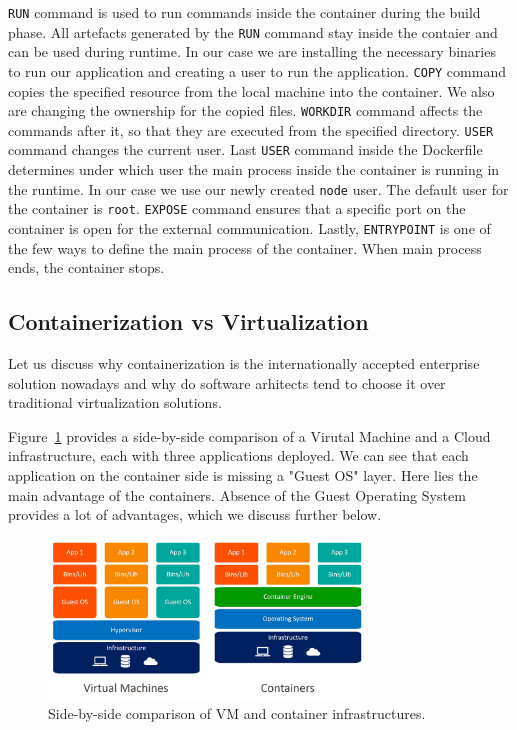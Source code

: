 \lstinline{RUN} command is used to run commands inside the container during the build phase. All artefacts generated by the \lstinline{RUN} command stay inside the contaier and can be used during runtime. In our case we are installing the necessary binaries to run our application and creating a user to run the application. \lstinline{COPY} command copies the specified resource from the local machine into the container. We also are changing the ownership for the copied files. \lstinline{WORKDIR} command affects the commands after it, so that they are executed from the specified directory. \lstinline{USER} command changes the current user. Last \lstinline{USER} command inside the Dockerfile determines under which user the main process inside the container is running in the runtime. In our case we use our newly created \lstinline{node} user. The default user for the container is \lstinline{root}. \lstinline{EXPOSE} command ensures that a specific port on the container is open for the external communication. Lastly, \lstinline{ENTRYPOINT} is one of the few ways to define the main process of the container. When main process ends, the container stops.

\subsection{Containerization vs Virtualization}

Let us discuss why containerization is the internationally accepted enterprise solution nowadays and why do software arhitects tend to choose it over traditional virtualization solutions.

Figure~\ref{img:containers-vs-virtual-machines} provides a side-by-side comparison of a Virutal Machine and a Cloud infrastructure, each with three applications deployed. We can see that each application on the container side is missing a "Guest OS" layer. Here lies the main advantage of the containers. Absence of the Guest Operating System provides a lot of advantages, which we discuss further below.

\begin{figure}[!hbt]
	\begin{center}
		\includegraphics[width=0.75\textwidth]{images/containers-vs-virtual-machines.jpg}
        \caption{Side-by-side comparison of VM and container infrastructures.}
		\label{img:containers-vs-virtual-machines}
	\end{center}
\end{figure}

